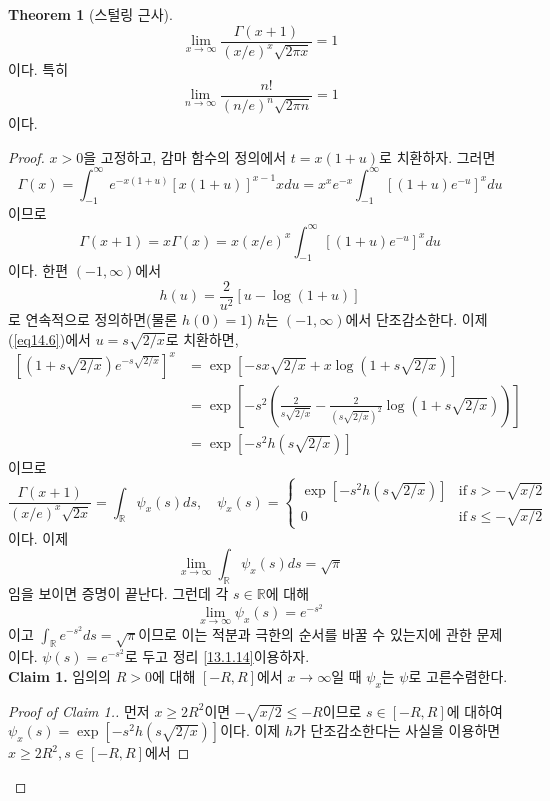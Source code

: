 \documentclass[11pt]{book}
\numberwithin{equation}{chapter}
\def\RR{\mathbb{R}}
\newcommand{\paren}[1]{\left(#1\right)}
\newcommand{\sqbracket}[1]{\left[#1\right]}
\def\textif{\text{if}}
\theoremstyle{definition}
\newtheorem{thm}{Theorem}[section]
\begin{document}
\begin{thm}[스털링 근사]
    \[
        \lim_{x \to \infty} \frac{\Gamma(x+1)}{(x/e)^x \sqrt{2\pi x}} = 1
    \]
    이다. 특히
    \[
        \lim_{n \to \infty} \frac{n!}{(n/e)^n \sqrt{2\pi n}} = 1
    \]
    이다.
\end{thm}
\begin{proof}
    \(x > 0\)을 고정하고, 감마 함수의 정의에서 \(t = x(1+u)\)로 치환하자. 그러면
    \[
        \Gamma(x) = \int_{-1}^\infty e^{-x(1+u)} [x(1+u)]^{x-1} xdu = x^x e^{-x} \int_{-1}^\infty [(1+u)e^{-u}]^x du
    \]
    이므로
    \begin{equation} \label{eq14.6}
        \Gamma(x+1) = x\Gamma(x) = x(x/e)^x \int_{-1}^\infty [(1+u)e^{-u}]^x du  
    \end{equation}
    이다. 한편 \((-1, \infty)\)에서 
    \[
        h(u) = \frac{2}{u^2} [u - \log (1+u)]
    \]
    로 연속적으로 정의하면(물론 \(h(0) = 1\)) \(h\)는 \((-1, \infty)\)에서 단조감소한다. 이제 (\ref{eq14.6})에서 \(u = s\sqrt{2/x}\)로 치환하면,
    \begin{align*}
        \sqbracket{(1 + s\sqrt{2/x}) e^{-s\sqrt{2/x}}}^x &= \exp \sqbracket{-sx\sqrt{2/x} + x \log (1 + s\sqrt{2/x})}\\
        &= \exp \sqbracket{-s^2 \paren{\frac{2}{s \sqrt{2/x}} - \frac{2}{(s \sqrt{2/x})^2} \log (1 + s\sqrt{2/x})}}\\
        &= \exp[-s^2 h(s \sqrt{2/x})]
    \end{align*}
    이므로
    \[
    \frac{\Gamma(x+1)}{(x/e)^x \sqrt{2x}} = \int_\RR \psi_x(s) ds, \quad \psi_x(s) = \begin{cases}
        \exp[-s^2 h(s \sqrt{2/x})] &\textif \ s > -\sqrt{x/2}\\
        0 &\textif \ s \le -\sqrt{x/2}
    \end{cases}   
    \]
    이다. 이제
    \[
    \lim_{x \to \infty} \int_\RR \psi_x(s) ds = \sqrt{\pi}    
    \]
    임을 보이면 증명이 끝난다. 그런데 각 \(s \in \RR\)에 대해
    \[
    \lim_{x \to \infty} \psi_x(s) = e^{-s^2}    
    \]
    이고 \(\int_{\RR} e^{-s^2} ds = \sqrt{\pi}\)이므로 이는 적분과 극한의 순서를 바꿀 수 있는지에 관한 문제이다. \(\psi(s) = e^{-s^2}\)로 두고 정리 \ref{13.1.14}\를 이용하자.\\
    \textbf{Claim 1.} 임의의 \(R > 0\)에 대해 \([-R, R]\)에서 \(x \to \infty\)일 때 \(\psi_x\)는 \(\psi\)로 고른수렴한다.
    \begin{proof}[Proof of Claim 1.]
        먼저 \(x \ge 2R^2\)이면 \(- \sqrt{x/2} \le -R\)이므로 \(s \in [-R, R]\)에 대하여 \(\psi_x(s) = \exp[-s^2 h(s \sqrt{2/x})]\)이다. 이제 \(h\)가 단조감소한다는 사실을 이용하면 \(x \ge 2R^2, s \in [-R, R]\)에서

\end{proof}
\end{proof}
\end{document}
